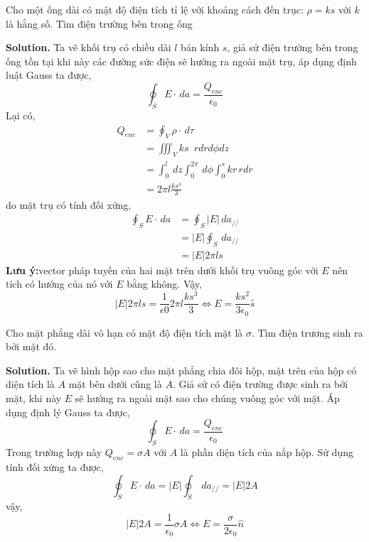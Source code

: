 \begin{enumerate}
\begin{problem}
Cho một ống dài có mật độ điện tích tỉ lệ với khoảng cách đến trục: $\rho = ks$ với $k$ là hằng số. Tìm điện trường bên trong ống
\end{problem} 

\textbf{Solution.}
Ta vẽ khối trụ có chiều dài $l$ bán kính $s$, giả sử điện trường bên trong ống tồn tại khi này các đường sức điện sẽ hướng ra ngoài mặt trụ, áp dụng định luật Gauss ta được,
\[
\oint_{S} E \cdot \, da =  \frac{Q_{enc}}{\epsilon_{0}}
\]
Lại có,
\begin{align*}
Q_{enc} &= \oint_{V} \rho \cdot \, d \tau \\[6pt]
&= \iiint_V ks \, \, \, rdr d\phi dz \\[6pt]
&= \int_{0}^{l} \, dz \int_{0}^{2\pi} \, d\phi \int_{0}^{s} kr \, rdr \\[6pt]
&= 2\pi l \frac{ks^3}{3}
\end{align*}
do mặt trụ có tính đối xứng,
\begin{align*}
\oint_{S} E \cdot \, da &=  \oint_{S} \left| E \right|  \, da_{//} \\[6pt]
&= \left| E \right| \oint_{S}  \, da_{//} \\[6pt]
&= \left| E \right| 2\pi l s
\end{align*}
\textbf{Lưu ý:}vector pháp tuyến của hai mặt trên dưới khối trụ vuông góc với $E$ nên tích có hướng của nó với $E$ bằng không.
Vậy,
\[
\left| E \right| 2\pi l s = \frac{1}{\epsilon{0}} 2\pi l \frac{ks^3}{3} \Leftrightarrow E = \frac{k s^2}{3 \epsilon_{0}}\hat{s}
\]
\begin{problem}
Cho mặt phẳng dài vô hạn có mặt độ điện tích mặt là $\sigma$. Tìm điện trương sinh ra bởi mặt đó.
\end{problem}

\textbf{Solution.}
Ta vẽ hình hộp sao cho mặt phẳng chia đôi hộp, mặt trên của hộp có diện tích là $A$ mặt bên dưới cũng là $A$. Giả sử có điện trường được sinh ra bởi mặt, khi này $E$ sẽ hướng ra ngoài mặt sao cho chúng vuông góc với mặt. Áp dụng định lý Gauss ta được,
\[
\oint_{S} E \cdot \, da =  \frac{Q_{enc}}{\epsilon_{0}}
\]
Trong trường hợp này $Q_{enc} = \sigma A$ với $A$ là phần diện tích của nắp hộp. Sử dụng tính đối xứng ta được,
\[
\oint_{S} E \cdot \, da = \left| E \right| \oint_{S}  \, da_{//} = \left| E \right| 2A
\]
vậy,
\[
\left| E \right| 2A = \frac{1}{\epsilon_{0}}\sigma A \Leftrightarrow E = \frac{\sigma}{2\epsilon_{0}}\hat{n}
\]


\end{enumerate}
